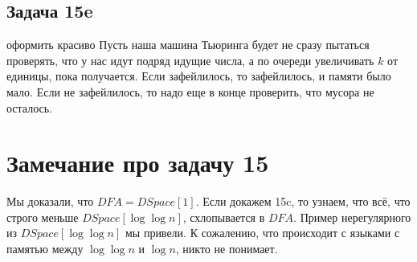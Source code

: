 \subsection{Задача 15e}
	\TODO оформить красиво
	Пусть наша машина Тьюринга будет не сразу пытаться проверять, что у нас идут подряд идущие числа,
	а по очереди увеличивать $k$ от единицы, пока получается.
	Если зафейлилось, то зафейлилось, и памяти было мало.
	Если не зафейлилось, то надо еще в конце проверить, что мусора не осталось.

\section{Замечание про задачу 15}
	Мы доказали, что $DFA=DSpace[1]$.
	Если докажем 15c, то узнаем, что всё, что строго меньше $DSpace[\log \log n]$,
	схлопывается в $DFA$.
	Пример нерегулярного из $DSpace[\log \log n]$ мы привели.
	К сожалению, что происходит с языками с памятью между $\log \log n$ и $\log n$, никто не понимает.
